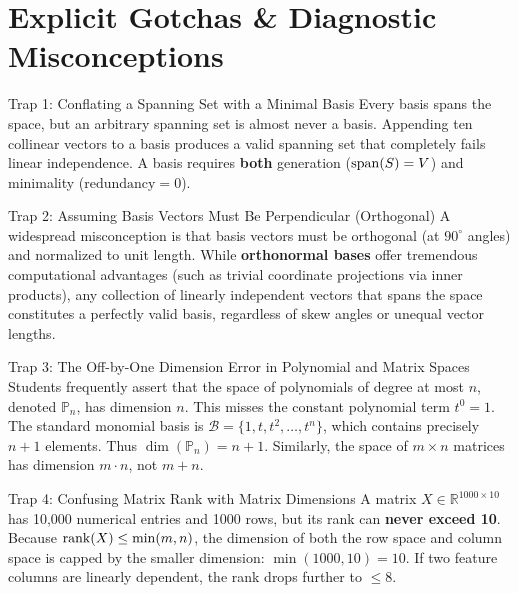 \section{Explicit Gotchas \& Diagnostic Misconceptions}

\begin{trapbox}{Trap 1: Conflating a Spanning Set with a Minimal Basis}
Every basis spans the space, but an arbitrary spanning set is almost never a basis. Appending ten collinear vectors to a basis produces a valid spanning set that completely fails linear independence. A basis requires \textbf{both} generation ($\operatorname{span}(S) = V$) and minimality ($\text{redundancy} = 0$).
\end{trapbox}

\begin{trapbox}{Trap 2: Assuming Basis Vectors Must Be Perpendicular (Orthogonal)}
A widespread misconception is that basis vectors must be orthogonal (at $90^\circ$ angles) and normalized to unit length. While \textbf{orthonormal bases} offer tremendous computational advantages (such as trivial coordinate projections via inner products), any collection of linearly independent vectors that spans the space constitutes a perfectly valid basis, regardless of skew angles or unequal vector lengths.
\end{trapbox}

\begin{trapbox}{Trap 3: The Off-by-One Dimension Error in Polynomial and Matrix Spaces}
Students frequently assert that the space of polynomials of degree at most $n$, denoted $\mathbb{P}_n$, has dimension $n$. This misses the constant polynomial term $t^0 = 1$. The standard monomial basis is $\mathcal{B} = \{1, t, t^2, \dots, t^n\}$, which contains precisely $n + 1$ elements. Thus $\dim(\mathbb{P}_n) = n + 1$. Similarly, the space of $m \times n$ matrices has dimension $m \cdot n$, not $m + n$.
\end{trapbox}

\begin{trapbox}{Trap 4: Confusing Matrix Rank with Matrix Dimensions}
A matrix $X \in \mathbb{R}^{1000 \times 10}$ has 10,000 numerical entries and 1000 rows, but its rank can \textbf{never exceed 10}. Because $\operatorname{rank}(X) \le \min(m, n)$, the dimension of both the row space and column space is capped by the smaller dimension: $\min(1000, 10) = 10$. If two feature columns are linearly dependent, the rank drops further to $\le 8$.
\end{trapbox}


